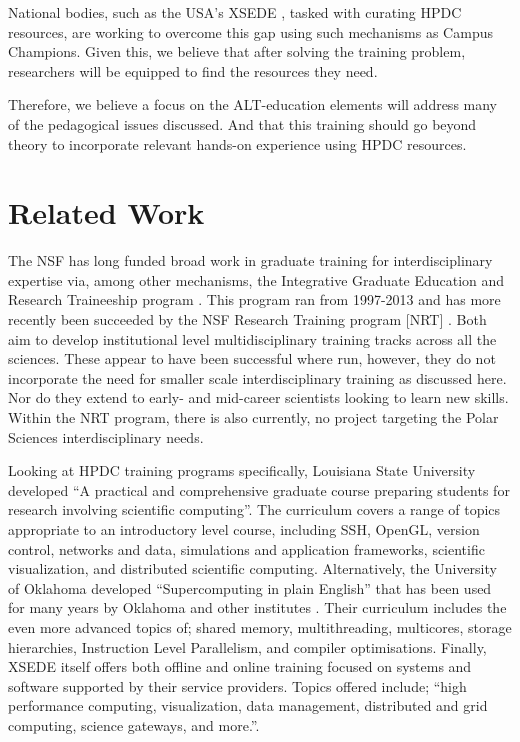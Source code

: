 \documentclass[conference]{IEEEtran}
\begin{document}
\begin{enumerate}
National bodies, such as the USA’s XSEDE \cite{noauthor_undated-lh}, tasked with curating HPDC resources, are working to overcome this gap using such mechanisms as Campus Champions.  Given this, we believe that after solving the training problem, researchers will be equipped to find the resources they need.
\end{enumerate}
Therefore, we believe a focus on the ALT-education elements will address many of the pedagogical issues discussed.  And that this training should go beyond theory to incorporate relevant hands-on experience using HPDC resources.

\section{Related Work}
The NSF has long funded broad work in graduate training for interdisciplinary expertise via, among other mechanisms, the Integrative Graduate Education and Research Traineeship program \cite{noauthor_undated-bu}.  This program ran from 1997-2013 and has more recently been succeeded by the NSF Research Training program [NRT] \cite{NRT}.  Both aim to develop institutional level multidisciplinary training tracks across all the sciences. These appear to have been successful where run, however, they do not incorporate the need for smaller scale interdisciplinary training as discussed here.  Nor do they extend to early- and mid-career scientists looking to learn new skills. Within the NRT program, there is also currently, no project targeting the Polar Sciences interdisciplinary needs.

Looking at HPDC training programs specifically, Louisiana State University developed “A practical and comprehensive graduate course preparing students for research involving scientific computing”\cite{Allen2011-qx}. The curriculum covers a range of topics appropriate to an introductory level course, including SSH, OpenGL, version control, networks and data, simulations and application frameworks, scientific visualization, and distributed scientific computing. Alternatively, the University of Oklahoma  developed “Supercomputing in plain English” \cite{Neeman2002-dk} that has been used for many years by Oklahoma and other institutes \cite{Neeman2008-mj}.  Their curriculum includes the even more advanced topics of; shared memory, multithreading, multicores, storage hierarchies, Instruction Level Parallelism, and compiler optimisations.  Finally, XSEDE itself offers both offline and online training focused on systems and software supported by their service providers. Topics offered include; “high performance computing, visualization, data management, distributed and grid computing, science gateways, and more.”\cite{noauthor_undated-ht}.  
\end{document}
